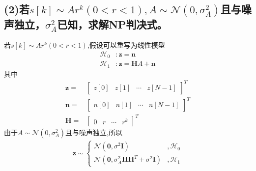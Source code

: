 \documentclass[fontset=windows]{article}
\numberwithin{figure}{section}
\begin{document}
\subsection*{(2)若\(s[k]\sim Ar^k(0<r<1),A\sim \mathcal{N}(0,\sigma^2_A)\)且与噪声独立，\(\sigma^2_A\)已知，求解NP判决式。}

若\(s[k]\sim Ar^k(0<r<1)\),假设可以重写为线性模型
\begin{align*}
    \mathcal{H}_0 & :\mathbf{z}=\mathbf{n}             \\
    \mathcal{H}_1 & :\mathbf{z}=\mathbf{H}A+\mathbf{n}
\end{align*}
其中
\begin{align*}
    \mathbf{z}=
     & \begin{bmatrix}
           z[0] & z[1] & \cdots & z[N-1]
       \end{bmatrix}^T \\
    \mathbf{n}=
     & \begin{bmatrix}
           n[0] & n[1] & \cdots & n[N-1]
       \end{bmatrix}^T \\
    \mathbf{H}=
     & \begin{bmatrix}
           0 & r & \cdots & r^k
       \end{bmatrix}^T
\end{align*}
由于\(A\sim \mathcal{N}(0,\sigma^2_A)\)且与噪声独立,所以
\begin{align*}
    \mathbf{z}\sim\left\{
    \begin{matrix}
        \mathcal{N}(\mathbf{0},\sigma^2\mathbf{I})                         & ,\mathcal{H}_0 \\
        \mathcal{N}(\mathbf{0},\sigma^2_A\mathbf{HH}^T+\sigma^2\mathbf{I}) & ,\mathcal{H}_1
    \end{matrix}
    \right.
\end{align*}
\end{document}
